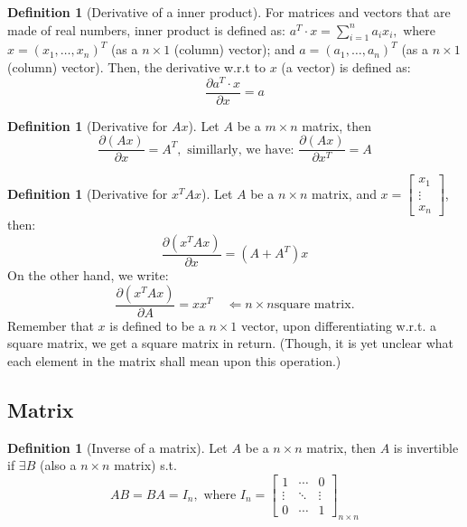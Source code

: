 \documentclass[12pt]{article}
\theoremstyle{definition}
\newtheorem{definition}[theorem]{Definition}
\theoremstyle{plain}
\begin{document}
\begin{definition}
    [Derivative of a inner product]
    For matrices and vectors that are made of real numbers, inner product is
    defined as:
    $
        a^T\cdot x = \sum_{i=1}^n a_i x_i,
    $
    where $x = (x_1, \ldots, x_n)^T$ (as a $n\times 1$ (column) vector); and $a =
    (a_1, \ldots, a_n)^T$ (as a $n\times 1$ (column) vector). Then, the
    derivative w.r.t to $x$ (a vector) is defined as:
    \[
        \frac{\partial a^T \cdot x}{\partial x} = a
    \]
\end{definition}

\begin{definition}
    [Derivative for  $A x$]
    Let $A$ be a $m\times n$ matrix, then
    \[
        \frac{\partial (A x)}{\partial x} = A^T, \text{ simillarly, we have: }
        \frac{\partial (Ax)}{\partial x^T} =A
    \]
\end{definition}

\begin{definition}
    [Derivative for $x^T A x$]
    Let $A$ be a $ n \times n $ matrix, and $x =
    \begin{bmatrix}
        x_1\\\vdots\\x_n
    \end{bmatrix}
    $, then:
    \[
        \frac{\partial \left( x^T A x \right)}{\partial x} = (A + A^T) x
    \]
    On the other hand, we write:
    \[
        \frac{\partial \left( x^T A x \right)}{\partial A} = x  x^T \quad
        \Leftarrow n \times n \text{
        square matrix.}
    \]
    Remember that $x$ is defined to be a $n\times 1$ vector, upon
    differentiating w.r.t. a square matrix, we get a square matrix in return.
    (Though, it is yet unclear what each element in the matrix shall mean upon
    this operation.)
\end{definition}

\subsection{Matrix}
\setcounter{theorem}{0}
\begin{definition}
    [Inverse of a matrix]
    Let $A$ be a $n\times n$ matrix, then $A$ is invertible if $\exists  B$
    (also a $n \times n$ matrix) s.t.
    \[
        A B =  BA = I_n, \text{ where } I_n =
        \begin{bmatrix}
            1 & \cdots & 0 \\
            \vdots & \ddots & \vdots \\
            0 & \cdots & 1
        \end{bmatrix} _ {n\times n}
    \]
\end{definition}
\end{document}
